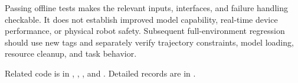 Passing offline tests makes the relevant inputs, interfaces, and failure handling checkable. It does not establish improved model capability, real-time device performance, or physical robot safety. Subsequent full-environment regression should use new tags and separately verify trajectory constraints, model loading, resource cleanup, and task behavior.

Related code is in , , , and . Detailed records are in .
